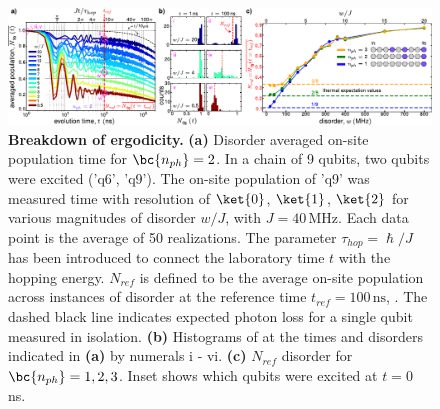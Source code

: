 \begin{figure}[!t]
    \centering
    \includegraphics[width= 150 mm, keepaspectratio]{./PDF/f2_190731_237p.pdf}
    \caption{\small
    \textbf{Breakdown of ergodicity.}
    \textbf{(a)} Disorder averaged on-site population  time for $\bc{n_{ph}}=2$.
    In a chain of 9 qubits, two qubits were excited ('q6', 'q9').
    The on-site population of 'q9' was measured  time with resolution of $\ket{0}$, $\ket{1}$, $\ket{2}$ for various magnitudes of disorder $w/J$, with $J=40 \, \text{MHz}$.  %
    Each data point is the average of 50 realizations.
    The parameter $\tau_{hop}=\hslash/J$ has been introduced to connect the laboratory time $t$ with the hopping energy.
    $N_{ref}$ is defined to be the average on-site population across instances of disorder at the reference time $t_{ref}=100\,\text{ns}$, .
    The dashed black line indicates expected photon loss for a single qubit measured in isolation.
    \textbf{(b)} Histograms of \bc{$\nqninet$}  at the times and disorders indicated in \textbf{(a)} by numerals i - vi. %
    \textbf{(c)} $N_{ref}$  disorder for $\bc{n_{ph}}=1, 2, 3$.
    Inset shows which qubits were excited at $t=0$ ns.
    }
    \label{fig_2i}
\end{figure}
\afterpage{\FloatBarrier}




